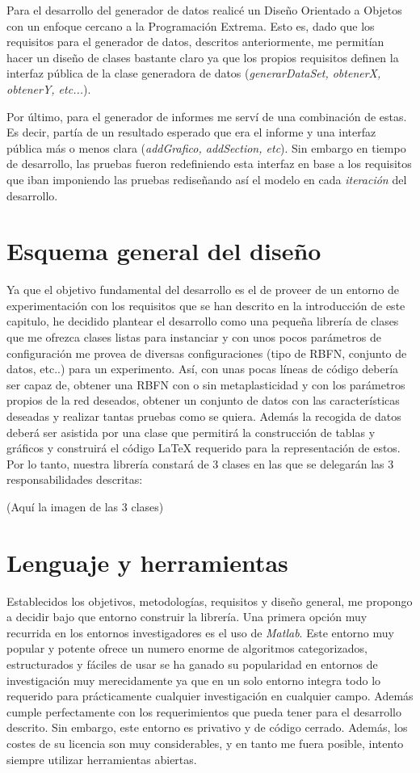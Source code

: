 \documentclass[10pt,a4paper]{report}
\begin{document}
Para el desarrollo del generador de datos realicé un Diseño Orientado a Objetos con un enfoque cercano a la Programación Extrema. Esto es, dado que los requisitos para el generador de datos, descritos anteriormente, me permitían hacer un diseño de clases bastante claro ya que los propios requisitos definen la interfaz pública de la clase generadora de datos (\textit{generarDataSet, obtenerX, obtenerY, etc...}).

Por último, para el generador de informes me serví de una combinación de estas. Es decir, partía de un resultado esperado que era el informe y una interfaz pública más o menos clara (\textit{addGrafico, addSection, etc}). Sin embargo en tiempo de desarrollo, las pruebas fueron redefiniendo esta interfaz en base a los requisitos que iban imponiendo las pruebas rediseñando así el modelo en cada \textit{iteración} del desarrollo.

\section{Esquema general del diseño}
Ya que el objetivo fundamental del desarrollo es el de proveer de un entorno de experimentación con los requisitos que se han descrito en la introducción de este capitulo, he decidido plantear el desarrollo como una pequeña librería de clases que me ofrezca clases listas para instanciar y con unos pocos parámetros de configuración me provea de diversas configuraciones (tipo de RBFN, conjunto de datos, etc..) para un experimento. Así, con unas pocas líneas de código debería ser capaz de, obtener una RBFN con o sin metaplasticidad y con los parámetros propios de la red deseados, obtener un conjunto de datos con las características deseadas y realizar tantas pruebas como se quiera. Además la recogida de datos deberá ser asistida por una clase que permitirá la construcción de tablas y gráficos y construirá el código LaTeX requerido para la representación de estos.
Por lo tanto, nuestra librería constará de 3 clases en las que se delegarán las 3 responsabilidades descritas:

(Aquí la imagen de las 3 clases)

\section{Lenguaje y herramientas}
Establecidos los objetivos, metodologías, requisitos y diseño general, me propongo a decidir bajo que entorno construir la librería.
Una primera opción muy recurrida en los entornos investigadores es el uso de \textit{Matlab}. Este entorno muy popular y potente ofrece un numero enorme de algoritmos categorizados, estructurados y fáciles de usar se ha ganado su popularidad en entornos de investigación muy merecidamente ya que en un solo entorno integra todo lo requerido para prácticamente cualquier investigación en cualquier campo. Además cumple perfectamente con los requerimientos que pueda tener para el desarrollo descrito. Sin embargo, este entorno es privativo y de código cerrado. Además, los costes de su licencia son muy considerables, y en tanto me fuera posible, intento siempre utilizar herramientas abiertas.
\end{document}
